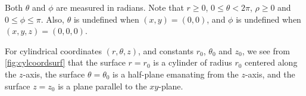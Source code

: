 Both $\theta$ and $\phi$ are measured in radians. Note that $r \ge 0$, $0 \le \theta < 2\pi$, $\rho \ge 0$ and $0 \le \phi \le \pi$. Also, $\theta$ is undefined when $(x,y) = (0,0)$, and $\phi$ is undefined when $(x,y,z) = (0,0,0)$.



For cylindrical coordinates $(r,\theta,z)$, and constants $r_0$, $\theta_0$ and $z_0$, we see from \autoref{fig:cylcoordsurf} that the surface $r = r_0$ is a cylinder of radius $r_0$ centered along the $z$-axis, the surface $\theta = \theta_0$ is a half-plane emanating from the $z$-axis, and the surface $z = z_0$ is a plane parallel to the $xy$-plane.

